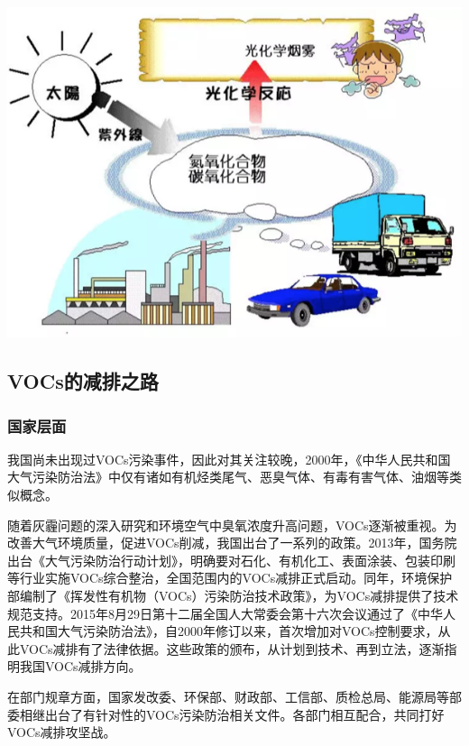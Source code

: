 \documentclass[
]{book}
\begin{document}
\includegraphics[width=8.33in]{images/voc6}

\hypertarget{vocsux7684ux51cfux6392ux4e4bux8def}{%
\subsection{VOCs的减排之路}\label{vocsux7684ux51cfux6392ux4e4bux8def}}

\hypertarget{ux56fdux5bb6ux5c42ux9762}{%
\subsubsection{国家层面}\label{ux56fdux5bb6ux5c42ux9762}}

我国尚未出现过VOCs污染事件，因此对其关注较晚，2000年，《中华人民共和国大气污染防治法》中仅有诸如有机烃类尾气、恶臭气体、有毒有害气体、油烟等类似概念。

随着灰霾问题的深入研究和环境空气中臭氧浓度升高问题，VOCs逐渐被重视。为改善大气环境质量，促进VOCs削减，我国出台了一系列的政策。2013年，国务院出台《大气污染防治行动计划》，明确要对石化、有机化工、表面涂装、包装印刷等行业实施VOCs综合整治，全国范围内的VOCs减排正式启动。同年，环境保护部编制了《挥发性有机物（VOCs）污染防治技术政策》，为VOCs减排提供了技术规范支持。2015年8月29日第十二届全国人大常委会第十六次会议通过了《中华人民共和国大气污染防治法》，自2000年修订以来，首次增加对VOCs控制要求，从此VOCs减排有了法律依据。这些政策的颁布，从计划到技术、再到立法，逐渐指明我国VOCs减排方向。

在部门规章方面，国家发改委、环保部、财政部、工信部、质检总局、能源局等部委相继出台了有针对性的VOCs污染防治相关文件。各部门相互配合，共同打好VOCs减排攻坚战。
\end{document}
